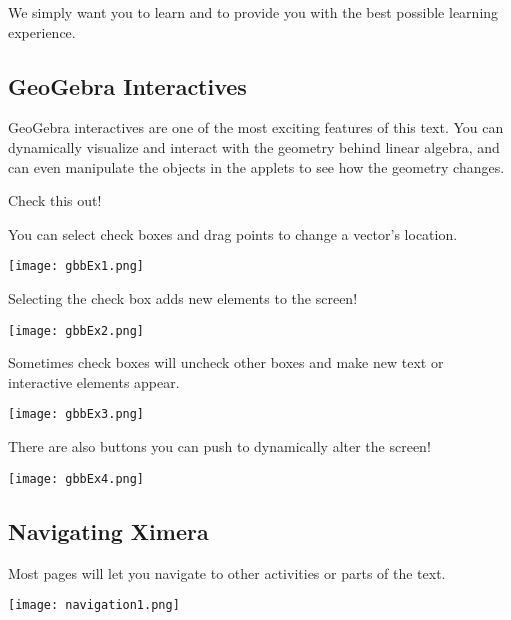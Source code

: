 \documentclass{ximera}
\begin{document}
 
We simply want you to learn and to provide you with the best possible
learning experience.
 
\subsection*{GeoGebra Interactives}
GeoGebra interactives are one of the most exciting features of this text. You can dynamically visualize and interact with the geometry behind linear algebra, and can even manipulate the objects in the applets to see how the geometry changes. 

Check this out!

\begin{center}
\end{center}

You can select check boxes and drag points to change a vector's location.

\begin{center}
  \texttt{[image: gbbEx1.png]}
\end{center}

Selecting the check box adds new elements to the screen!

\begin{center}
  \texttt{[image: gbbEx2.png]}
\end{center}

Sometimes check boxes will uncheck other boxes and make new text or interactive elements appear.

\begin{center}
  \texttt{[image: gbbEx3.png]}
\end{center}

There are also buttons you can push to dynamically alter the screen!

\begin{center}
  \texttt{[image: gbbEx4.png]}
\end{center}

\subsection*{Navigating Ximera}

Most pages will let you navigate to other activities or parts of the text.  

\begin{center}
  \texttt{[image: navigation1.png]}
\end{center}
\end{document}
